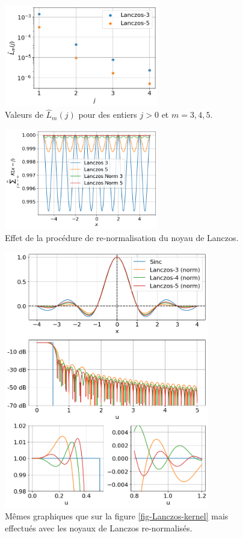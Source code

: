\documentclass[11pt,twoside]{article}
\begin{document}
\begin{figure}
\centering
\includegraphics[width=0.6\textwidth]{fig3.png}
\caption{Valeurs de $\hat{L}_m(j)$ pour des entiers $j>0$ et $m=3,4,5$.}
\label{fig-Lanczos-hat-j}
\end{figure}
\begin{figure}
\centering
\includegraphics[width=0.6\textwidth]{fig4.png}
\caption{Effet de la procédure de re-normalisation du noyau de Lanczos.}
\label{fig-Lanczos-renorm-closure}
\end{figure}
\begin{figure}
\centering
\includegraphics[width=0.8\textwidth]{fig5b.png}
\caption{Mêmes graphiques que sur la figure \ref{fig-Lanczos-kernel} mais effectués avec les noyaux de Lanczos re-normalisés.}
\label{fig-Lanczos-norm-kernel}
\end{figure}
\end{document}
